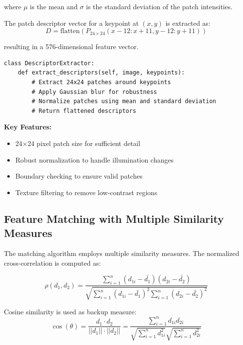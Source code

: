 \documentclass[12pt,a4paper]{article}
\begin{document}
where $\mu$ is the mean and $\sigma$ is the standard deviation of the patch intensities.

The patch descriptor vector for a keypoint at $(x,y)$ is extracted as:
\begin{equation}
D = \text{flatten}(P_{24 \times 24}(x-12:x+11, y-12:y+11))
\end{equation}

resulting in a 576-dimensional feature vector.

\begin{lstlisting}[caption=Descriptor Extraction Implementation]
class DescriptorExtractor:
    def extract_descriptors(self, image, keypoints):
        # Extract 24x24 patches around keypoints
        # Apply Gaussian blur for robustness
        # Normalize patches using mean and standard deviation
        # Return flattened descriptors
\end{lstlisting}

\textbf{Key Features:}
\begin{itemize}
    \item 24×24 pixel patch size for sufficient detail
    \item Robust normalization to handle illumination changes
    \item Boundary checking to ensure valid patches
    \item Texture filtering to remove low-contrast regions
\end{itemize}

\subsection{Feature Matching with Multiple Similarity Measures}

The matching algorithm employs multiple similarity measures. The normalized cross-correlation is computed as:

\begin{equation}
\rho(d_1, d_2) = \frac{\sum_{i=1}^{n} (d_{1i} - \bar{d_1})(d_{2i} - \bar{d_2})}{\sqrt{\sum_{i=1}^{n} (d_{1i} - \bar{d_1})^2 \sum_{i=1}^{n} (d_{2i} - \bar{d_2})^2}}
\end{equation}

Cosine similarity is used as backup measure:
\begin{equation}
\cos(\theta) = \frac{d_1 \cdot d_2}{||d_1|| \cdot ||d_2||} = \frac{\sum_{i=1}^{n} d_{1i} d_{2i}}{\sqrt{\sum_{i=1}^{n} d_{1i}^2} \sqrt{\sum_{i=1}^{n} d_{2i}^2}}
\end{equation}
\end{document}
